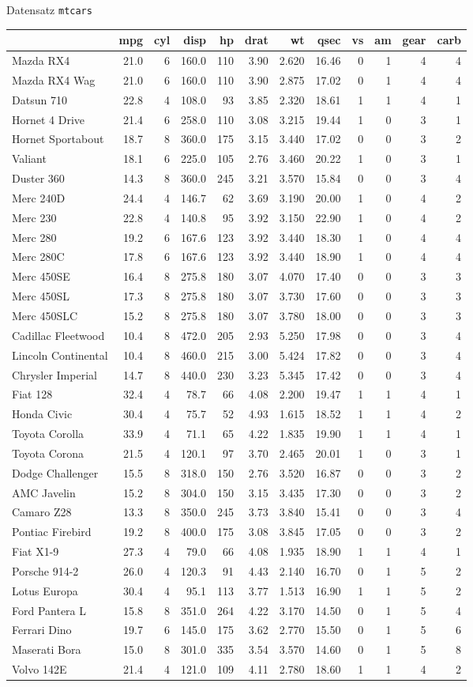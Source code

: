 \documentclass[ignorenonframetext,]{beamer}
\begin{document}
\begin{frame}{Datensatz \texttt{mtcars}}

\begin{longtable}[]{@{}lrrrrrrrrrrr@{}}
\toprule
& mpg & cyl & disp & hp & drat & wt & qsec & vs & am & gear &
carb\tabularnewline
\midrule
\endhead
Mazda RX4 & 21.0 & 6 & 160.0 & 110 & 3.90 & 2.620 & 16.46 & 0 & 1 & 4 &
4\tabularnewline
Mazda RX4 Wag & 21.0 & 6 & 160.0 & 110 & 3.90 & 2.875 & 17.02 & 0 & 1 &
4 & 4\tabularnewline
Datsun 710 & 22.8 & 4 & 108.0 & 93 & 3.85 & 2.320 & 18.61 & 1 & 1 & 4 &
1\tabularnewline
Hornet 4 Drive & 21.4 & 6 & 258.0 & 110 & 3.08 & 3.215 & 19.44 & 1 & 0 &
3 & 1\tabularnewline
Hornet Sportabout & 18.7 & 8 & 360.0 & 175 & 3.15 & 3.440 & 17.02 & 0 &
0 & 3 & 2\tabularnewline
Valiant & 18.1 & 6 & 225.0 & 105 & 2.76 & 3.460 & 20.22 & 1 & 0 & 3 &
1\tabularnewline
Duster 360 & 14.3 & 8 & 360.0 & 245 & 3.21 & 3.570 & 15.84 & 0 & 0 & 3 &
4\tabularnewline
Merc 240D & 24.4 & 4 & 146.7 & 62 & 3.69 & 3.190 & 20.00 & 1 & 0 & 4 &
2\tabularnewline
Merc 230 & 22.8 & 4 & 140.8 & 95 & 3.92 & 3.150 & 22.90 & 1 & 0 & 4 &
2\tabularnewline
Merc 280 & 19.2 & 6 & 167.6 & 123 & 3.92 & 3.440 & 18.30 & 1 & 0 & 4 &
4\tabularnewline
Merc 280C & 17.8 & 6 & 167.6 & 123 & 3.92 & 3.440 & 18.90 & 1 & 0 & 4 &
4\tabularnewline
Merc 450SE & 16.4 & 8 & 275.8 & 180 & 3.07 & 4.070 & 17.40 & 0 & 0 & 3 &
3\tabularnewline
Merc 450SL & 17.3 & 8 & 275.8 & 180 & 3.07 & 3.730 & 17.60 & 0 & 0 & 3 &
3\tabularnewline
Merc 450SLC & 15.2 & 8 & 275.8 & 180 & 3.07 & 3.780 & 18.00 & 0 & 0 & 3
& 3\tabularnewline
Cadillac Fleetwood & 10.4 & 8 & 472.0 & 205 & 2.93 & 5.250 & 17.98 & 0 &
0 & 3 & 4\tabularnewline
Lincoln Continental & 10.4 & 8 & 460.0 & 215 & 3.00 & 5.424 & 17.82 & 0
& 0 & 3 & 4\tabularnewline
Chrysler Imperial & 14.7 & 8 & 440.0 & 230 & 3.23 & 5.345 & 17.42 & 0 &
0 & 3 & 4\tabularnewline
Fiat 128 & 32.4 & 4 & 78.7 & 66 & 4.08 & 2.200 & 19.47 & 1 & 1 & 4 &
1\tabularnewline
Honda Civic & 30.4 & 4 & 75.7 & 52 & 4.93 & 1.615 & 18.52 & 1 & 1 & 4 &
2\tabularnewline
Toyota Corolla & 33.9 & 4 & 71.1 & 65 & 4.22 & 1.835 & 19.90 & 1 & 1 & 4
& 1\tabularnewline
Toyota Corona & 21.5 & 4 & 120.1 & 97 & 3.70 & 2.465 & 20.01 & 1 & 0 & 3
& 1\tabularnewline
Dodge Challenger & 15.5 & 8 & 318.0 & 150 & 2.76 & 3.520 & 16.87 & 0 & 0
& 3 & 2\tabularnewline
AMC Javelin & 15.2 & 8 & 304.0 & 150 & 3.15 & 3.435 & 17.30 & 0 & 0 & 3
& 2\tabularnewline
Camaro Z28 & 13.3 & 8 & 350.0 & 245 & 3.73 & 3.840 & 15.41 & 0 & 0 & 3 &
4\tabularnewline
Pontiac Firebird & 19.2 & 8 & 400.0 & 175 & 3.08 & 3.845 & 17.05 & 0 & 0
& 3 & 2\tabularnewline
Fiat X1-9 & 27.3 & 4 & 79.0 & 66 & 4.08 & 1.935 & 18.90 & 1 & 1 & 4 &
1\tabularnewline
Porsche 914-2 & 26.0 & 4 & 120.3 & 91 & 4.43 & 2.140 & 16.70 & 0 & 1 & 5
& 2\tabularnewline
Lotus Europa & 30.4 & 4 & 95.1 & 113 & 3.77 & 1.513 & 16.90 & 1 & 1 & 5
& 2\tabularnewline
Ford Pantera L & 15.8 & 8 & 351.0 & 264 & 4.22 & 3.170 & 14.50 & 0 & 1 &
5 & 4\tabularnewline
Ferrari Dino & 19.7 & 6 & 145.0 & 175 & 3.62 & 2.770 & 15.50 & 0 & 1 & 5
& 6\tabularnewline
Maserati Bora & 15.0 & 8 & 301.0 & 335 & 3.54 & 3.570 & 14.60 & 0 & 1 &
5 & 8\tabularnewline
Volvo 142E & 21.4 & 4 & 121.0 & 109 & 4.11 & 2.780 & 18.60 & 1 & 1 & 4 &
2\tabularnewline
\bottomrule
\end{longtable}


\end{frame}
\end{document}
